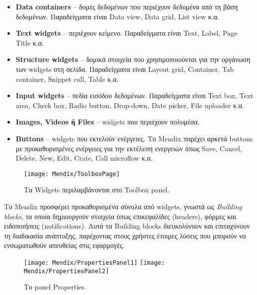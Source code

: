                 \begin{itemize}[label={\tiny \blacksquare}]
                    \setlength\itemsep{-0.25em}
                    \item \textbf{Data containers} -- δομές δεδομένων που περιέχουν δεδομένα από τη βάση δεδομένων. Παραδείγματα είναι Data view, Data grid, List view κ.α.
                    \item \textbf{Text widgets} -- περιέχουν κείμενο. Παραδείγματα είναι Text, Label, Page Title κ.α.
                    \item \textbf{Structure widgets} -- δομικά στοιχεία που χρησιμοποιούνται για την οργάνωση των widgets στη σελίδα. Παραδείγματα είναι Layout grid, Container, Tab container, Snippet call, Table κ.α.
                    \item \textbf{Input widgets} -- πεδία εισόδου δεδομένων. Παραδείγματα είναι Text box, Text area, Check box, Radio button, Drop-down, Date picker, File uploader κ.α.
                    \item \textbf{Images, Videos ή Files} -- widgets που περιέχουν πολυμέσα.
                    \item \textbf{Buttons} -- widgets που εκτελούν ενέργειες. Το Mendix παρέχει αρκετά buttons με προκαθορισμένες ενέργειες για την εκτέλεση ενεργειών όπως Save, Cancel, Delete, New, Edit, Crate, Call microflow κ.α.
                \end{itemize}

            \begin{figure}[h!] \noindent \centering
                    \texttt{[image: Mendix/ToolboxPage]}
                    \caption{\centering Τα Widgets περιλαμβάνονται στο Toolbox panel.}
            \end{figure}

                Tο Mendix προσφέρει προκαθορισμένα σύνολα από widgets, γνωστά ως \textit{Building blocks}, τα οποία δημιουργούν στοιχεία όπως επικεφαλίδες (headers), φόρμες και ειδοποιήσεις (notifications). Αυτά τα Building blocks διευκολύνουν και επιταχύνουν τη διαδικασία ανάπτυξης, παρέχοντας στους χρήστες έτοιμες λύσεις που μπορούν να ενσωματωθούν απευθείας στις εφαρμογές.

                \begin{figure}[h!] \noindent \centering
                        \texttt{[image: Mendix/PropertiesPanel1]}
                        \texttt{[image: Mendix/PropertiesPanel2]}
                        \caption{\centering Το panel Properties.}
                \end{figure}


